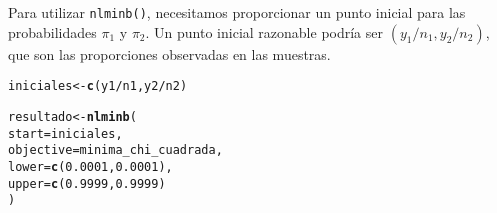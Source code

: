 \documentclass[paper=letter, fontsize=11pt]{scrartcl}\usepackage[]{graphicx}\usepackage[]{xcolor}
\makeatletter
\newcommand{\hlnum}[1]{\textcolor[rgb]{0.686,0.059,0.569}{#1}}%
\newcommand{\hlopt}[1]{\textcolor[rgb]{0,0,0}{#1}}%
\newcommand{\hldef}[1]{\textcolor[rgb]{0.345,0.345,0.345}{#1}}%
\newcommand{\hlkwb}[1]{\textcolor[rgb]{0.69,0.353,0.396}{#1}}%
\newcommand{\hlkwc}[1]{\textcolor[rgb]{0.333,0.667,0.333}{#1}}%
\newcommand{\hlkwd}[1]{\textcolor[rgb]{0.737,0.353,0.396}{\textbf{#1}}}%
\newenvironment{kframe}{%
 \def\at@end@of@kframe{}%
 \ifinner\ifhmode%
  \def\at@end@of@kframe{\end{minipage}}%
  \begin{minipage}{\columnwidth}%
 \fi\fi%
 \def\FrameCommand##1{\hskip\@totalleftmargin \hskip-\fboxsep
 \colorbox{shadecolor}{##1}\hskip-\fboxsep
     \hskip-\linewidth \hskip-\@totalleftmargin \hskip\columnwidth}%
 \MakeFramed {\advance\hsize-\width
   \@totalleftmargin\z@ \linewidth\hsize
   \@setminipage}}%
 {\par\unskip\endMakeFramed%
 \at@end@of@kframe}
\newenvironment{knitrout}{}{} %
\numberwithin{equation}{problemcounter} %
\numberwithin{figure}{problemcounter} %
\numberwithin{table}{problemcounter} %
\numberwithin{subsection}{problemcounter}
\makeatother
\begin{document}
Para utilizar \texttt{nlminb()}, necesitamos proporcionar un punto inicial para las probabilidades $\pi_1$ y $\pi_2$. Un punto inicial razonable podría ser $(y_1/n_1, y_2/n_2)$, que son las proporciones observadas en las muestras.

\begin{knitrout}
\color{fgcolor}\begin{kframe}
\begin{alltt}
\hldef{iniciales} \hlkwb{<-} \hlkwd{c}\hldef{(y1}\hlopt{/}\hldef{n1, y2}\hlopt{/}\hldef{n2)}

\hldef{resultado} \hlkwb{<-} \hlkwd{nlminb}\hldef{(}
    \hlkwc{start} \hldef{= iniciales,}
    \hlkwc{objective} \hldef{= minima_chi_cuadrada,}
    \hlkwc{lower} \hldef{=} \hlkwd{c}\hldef{(}\hlnum{0.0001}\hldef{,} \hlnum{0.0001}\hldef{),}
    \hlkwc{upper} \hldef{=} \hlkwd{c}\hldef{(}\hlnum{0.9999}\hldef{,} \hlnum{0.9999}\hldef{)}
\hldef{)}
\end{alltt}
\end{kframe}
\end{knitrout}
\end{document}
